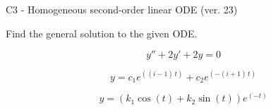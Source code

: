 \begin{exercise}
  \begin{exerciseTitle}C3 - Homogeneous second-order linear ODE (ver. 23)\end{exerciseTitle}
  \begin{exerciseStatement}
    
Find the general solution to the given ODE.

    
\[y''+2y'+2y = 0\]

  \end{exerciseStatement}
  \begin{exerciseAnswer}
    
\[y= c_{1} e^{\left(\left(i - 1\right) \, t\right)} + c_{2} e^{\left(-\left(i + 1\right) \, t\right)}\]

    
\[y= {\left(k_{1} \cos\left(t\right) + k_{2} \sin\left(t\right)\right)} e^{\left(-t\right)}\]

  \end{exerciseAnswer}
\end{exercise}